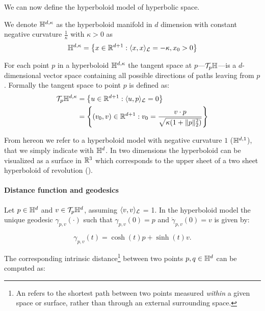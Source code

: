 We can now define the hyperboloid model of hyperbolic space.
\begin{definition}
    We denote $\mathbb{H}^{d,\kappa}$ as the hyperboloid manifold in $d$ dimension with constant negative curvature $\frac{1}{\kappa}$ with $\kappa>0$ as
    \begin{equation*}
        \mathbb{H}^{d,\kappa} = \left\{x \in \mathbb{R}^{d+1} : \langle x, x \rangle_{\mathcal{L}} = -\kappa, x_0 > 0\right\}
    \end{equation*}
\end{definition}



For each point $p$ in a hyperboloid $\mathbb{H}^{d,\kappa}$ the tangent space at $p$---$\mathcal{T}_p\mathbb{H}$---is a $d$-dimensional vector space containing all possible directions of paths leaving from $p$. 
Formally the tangent space to point $p$ is defined as:
\begin{align}\label{eq:tangentSpace}
    \mathcal{T}_p\mathbb{H}^{d,\kappa} 
    &= \left\{u\in \mathbb{R}^{d+1} : \langle u, p \rangle_{\mathcal{L}} = 0\right\} \\
    &= \left\{(v_0,v) \in \mathbb{R}^{d+1} : v_0 = \frac{v \cdot p}{\sqrt{\kappa(1 + \|p\|^2_2)}}\right\}
\end{align}

From hereon we refer to a hyperboloid model with negative curvature $1$ ($\mathbb{H}^{d,1}$), that we simply indicate with $\mathbb{H}^d$. In two dimensions the hyperboloid can be visualized as a surface in $\mathbb{R}^3$ which corresponds to the upper sheet of a two sheet hyperboloid of revolution ().

\paragraph{Distance function and geodesics}
Let $p\in\mathbb{H}^d$ and $v\in \mathcal{T}_p\mathbb{H}^d$, assuming $\langle v,v\rangle_{\mathcal{L}} $ = 1. In the hyperboloid model the unique geodesic $\gamma_{p,v}(\cdot)$ such that $\gamma_{p,v}(0)=p$ and $\dot{\gamma}_{p,v}(0)=v$ is given by:

\begin{equation*}
    \gamma_{p,v}(t) = \cosh(t)p + \sinh(t)v.
\end{equation*}

The corresponding intrinsic distance\footnote{An  refers to the shortest path between two points measured \emph{within} a given space or surface, rather than through an external surrounding space.} between two points $p,q\in\mathbb{H}^d$ can be computed as:

